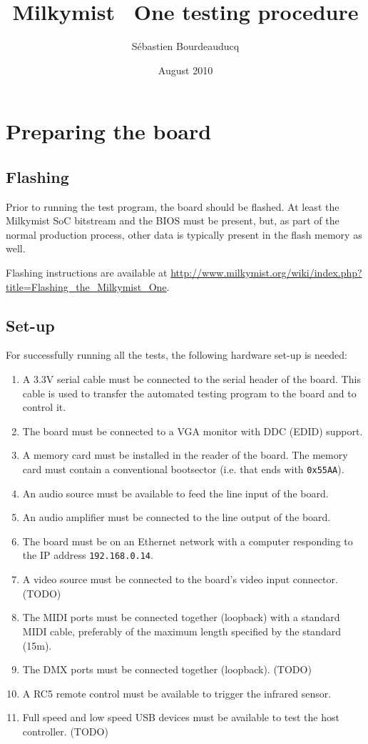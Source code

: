 \documentclass[a4paper,11pt]{article}
\title{Milkymist\texttrademark~ One testing procedure}
\author{S\'ebastien Bourdeauducq}
\date{August 2010}
\begin{document}
\setlength{\parindent}{0pt}
\setlength{\parskip}{5pt}
\maketitle{}


\section{Preparing the board}
\subsection{Flashing}
Prior to running the test program, the board should be flashed. At least the Milkymist SoC bitstream and the BIOS must be present, but, as part of the normal production process, other data is typically present in the flash memory as well.

Flashing instructions are available at \url{http://www.milkymist.org/wiki/index.php?title=Flashing_the_Milkymist_One}.

\subsection{Set-up}
For successfully running all the tests, the following hardware set-up is needed:
\begin{enumerate}
\item A 3.3V serial cable must be connected to the serial header of the board. This cable is used to transfer the automated testing program to the board and to control it.
\item The board must be connected to a VGA monitor with DDC (EDID) support.
\item A memory card must be installed in the reader of the board. The memory card must contain a conventional bootsector (i.e. that ends with \verb!0x55AA!).
\item An audio source must be available to feed the line input of the board.
\item An audio amplifier must be connected to the line output of the board.
\item The board must be on an Ethernet network with a computer responding to the IP address \verb!192.168.0.14!.
\item A video source must be connected to the board's video input connector. (TODO)
\item The MIDI ports must be connected together (loopback) with a standard MIDI cable, preferably of the maximum length specified by the standard (15m).
\item The DMX ports must be connected together (loopback). (TODO)
\item A RC5 remote control must be available to trigger the infrared sensor.
\item Full speed and low speed USB devices must be available to test the host controller. (TODO)
\end{enumerate}
\end{document}
